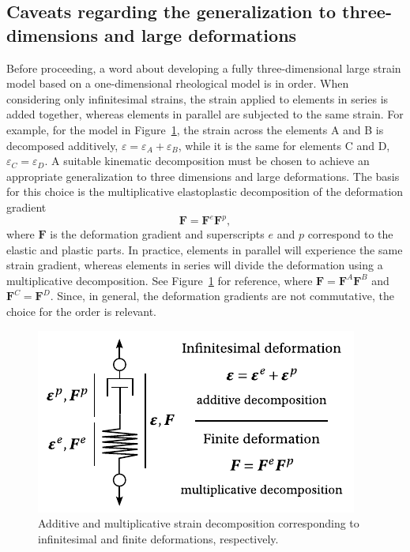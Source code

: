 
\subsection{Caveats regarding the generalization to three-dimensions and large deformations}
\label{sec:generalization_large_strains_3d}

Before proceeding, a word about developing a fully three-dimensional large strain model based on a one-dimensional rheological model is in order.
When considering only infinitesimal strains, the strain applied to elements in series is added together, whereas elements in parallel are subjected to the same strain.
For example, for the model in Figure~\ref{fig:gradient_decomp}, the strain across the elements A and B is decomposed additively, $\varepsilon = \varepsilon_A + \varepsilon_B$, while it is the same for elements C and D, $\varepsilon_C = \varepsilon_D$.
A suitable kinematic decomposition must be chosen to achieve an appropriate generalization to three dimensions and large deformations.
The basis for this choice is the multiplicative elastoplastic decomposition of the deformation gradient \citep{desouzanetoComputationalMethodsPlasticity2008}
\begin{equation}
	\label{eq:mult_gradient_decomp}
\mathbf F = \mathbf F^e \mathbf F^p,
\end{equation}
where $\mathbf F$ is the deformation gradient and superscripts $e$ and $p$ correspond to the elastic and plastic parts.
In practice, elements in parallel will experience the same strain gradient, whereas elements in series will divide the deformation using a multiplicative decomposition.
See Figure~\ref{fig:gradient_decomp} for reference, where $\mathbf F = \mathbf F^A \mathbf F^B$ and $\mathbf F^C = \mathbf F^D$.
Since, in general, the deformation gradients are not commutative, the choice for the order is relevant.
\begin{figure}
	\centering
	\includegraphics{figures/gradient_decomp}
	\caption{Additive and multiplicative strain decomposition corresponding to infinitesimal and finite deformations, respectively.}
\label{fig:gradient_decomp}
\end{figure}

